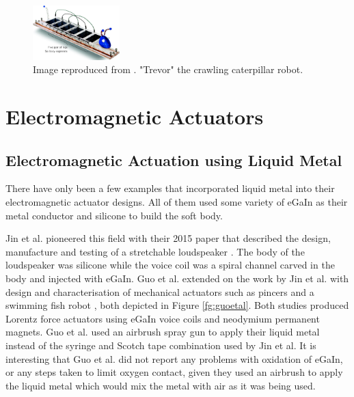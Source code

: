 \documentclass[a4paper,12pt]{article}
\begin{document}
\begin{figure}[h!]
    \centering
    \includegraphics[width=0.3\textwidth]{catepillar.png}
    \caption{Image reproduced from \cite{henkeSoftDielectricElastomer2017}. "Trevor" the crawling caterpillar robot.}
    \label{fg:catepillar}
\end{figure}

\section{Electromagnetic Actuators}

\subsection{Electromagnetic Actuation using Liquid Metal}
There have only been a few examples that incorporated liquid metal into their electromagnetic actuator designs. All of them used some variety of eGaIn as their metal conductor and silicone to build the soft body.

Jin et al. pioneered this field with their 2015 paper that described the design, manufacture and testing of a stretchable loudspeaker \cite{jinStretchableLoudspeakerUsing2015}. The body of the loudspeaker was silicone while the voice coil was a spiral channel carved in the body and injected with eGaIn. Guo et al. extended on the work by Jin et al. with design and characterisation of mechanical actuators such as pincers and a swimming fish robot \cite{guoLiquidMetalSpiral2018}, both depicted in Figure \ref{fg:guoetal}. Both studies produced Lorentz force actuators using eGaIn voice coils and neodymium permanent magnets. Guo et al. used an airbrush spray gun to apply their liquid metal instead of the syringe and Scotch tape combination used by Jin et al. It is interesting that Guo et al. did not report any problems with oxidation of eGaIn, or any steps taken to limit oxygen contact, given they used an airbrush to apply the liquid metal which would mix the metal with air as it was being used.
\end{document}
